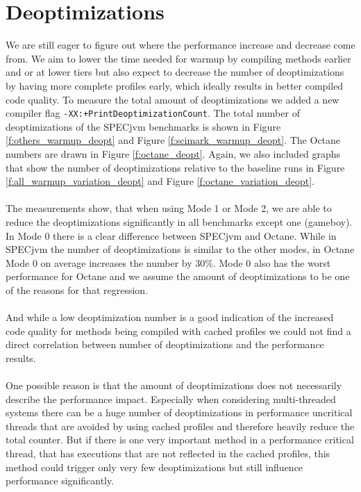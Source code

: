 \section{Deoptimizations}
\label{s:perf_deoptimizations}
We are still eager to figure out where the performance increase and decrease come from.
We aim to lower the time needed for warmup by compiling methods earlier and or at lower tiers but also expect to decrease the number of deoptimizations by having more complete profiles early, which ideally results in better compiled code quality. To measure the total amount of deoptimizations we added a new compiler flag \texttt{-XX:+PrintDeoptimizationCount}.
The total number of deoptimizations of the SPECjvm benchmarks is shown in Figure \ref{f:others_warmup_deopt} and Figure \ref{f:scimark_warmup_deopt}. The Octane numbers are drawn in Figure \ref{f:octane_deopt}.
Again, we also included graphs that show the number of deoptimizations relative to the baseline runs in Figure \ref{f:all_warmup_variation_deopt} and Figure \ref{f:octane_variation_deopt}.
\\\\
The measurements show, that when using Mode 1 or Mode 2, we are able to reduce the deoptimizations significantly in all benchmarks except one (gameboy). In Mode 0 there is a clear difference between SPECjvm and Octane. While in SPECjvm the number of deoptimizations is similar to the other modes, in Octane Mode 0 on average increases the number by 30\%. Mode 0 also has the worst performance for Octane and we assume the amount of deoptimizations to be one of the reasons for that regression.
\\\\
And while a low deoptimization number is a good indication of the increased code quality for methods being compiled with cached profiles we could not find a direct correlation between number of deoptimizations and the performance results.
\\\\
One possible reason is that the amount of deoptimizations does not necessarily describe the performance impact. Especially when considering multi-threaded systems there can be a huge number of deoptimizations in performance uncritical threads that are avoided by using cached profiles and therefore heavily reduce the total counter. But if there is one very important method in a performance critical thread, that has executions that are not reflected in the cached profiles, this method could trigger only very few deoptimizations but still influence performance significantly.
